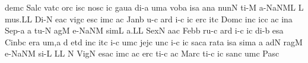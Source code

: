 \sgn dem\punctum c\egn
\spatium
\sgn Sal\punctum c\egn
\sgn vat\punctum c\egn
\sgn {}or\punctum c\egn
\sgn {}is\punctum c\egn
\spatium
\sgn nos\punctum c\egn
{}i{}\punctum c\egn
\spatium
\sgn gau\punctum a\egn
\sgn di-\punctum a\egn
\sgn {}um\punctum a\egn
\spatium
\sgn vob\punctum a\egn
\sgn {}is\punctum a\egn
\spatium
\sgn {}an\punctum a\egn
\sgn nun\punctum N\egn
\sgn ti-\punctum M\egn
\sgn {}a-\pessubbipunctis NaNM\nonspatium\punctuminclinatum L\egn
\custos L
\lineaproxima
\sgn mu{s.}\punctum L\augmentum L\egn
\spatium
\divisiofinalis
\spatium
\sgn Di-\punctum N\egn
\sgn {}e{}\pes ac\egn
\spatium
\sgn vig\punctum c\egn
\sgn {}es\punctum c\egn
\sgn {}im\punctum c\egn
\sgn {}a{}\punctum c\egn
\spatium
\sgn Jan\punctum b\egn
\sgn {}u-\punctum c\egn
\sgn {}ar\punctum d\egn
\sgn {}i-\punctum c\egn
\sgn {}i{}\punctum c\egn
\spatium
\sgn {}er\punctum c\egn
\sgn {}it\punctum c\egn
\spatium
\sgn Dom\punctum c\egn
\sgn {}in\punctum c\egn
\sgn {}ic\punctum c\egn
\sgn {}a{}\punctum c\egn
\spatium
\sgn {}in\punctum a\egn
\spatium
\sgn Se{p-}\punctum a\egn
\custos a
\lineaproxima
\sgn tu-\punctum N\egn
\sgn {}ag\punctum M\egn
\sgn {}e-\pessubbipunctis NaNM\egn
\sgn sim\punctum L\egn
\sgn {}a.\punctum L\augmentum L\egn
\spatium
\divisiofinalis
\spatium
\sgn Sex\punctum N\egn
{}a{}\pes ac\egn
\spatium
\sgn Feb\punctum b\egn
\sgn ru-\punctum c\egn
\sgn {}ar\punctum d\egn
\sgn {}i-\punctum c\egn
\sgn {}i{}\punctum c\egn
\spatium
\sgn di-\punctum b\egn
\sgn {}es\punctum a\egn
\spatium
\sgn Cin\pes bc\egn
\sgn {}er\punctum a\egn
\sgn {}u{m,}\punctum a\egn
\spatium
\divisiominima
\spatium
\custos d
\lineaproxima
\sgn { }et\punctum d\egn
\spatium
\sgn {}in\punctum c\egn
\sgn {}it\punctum c\egn
\sgn {}i-\punctum c\egn
\sgn {}um\punctum c\egn
\spatium
\sgn jej\punctum c\egn
\sgn {}un\punctum c\egn
\sgn {}i-\punctum c\egn
\sgn {}i{}\punctum c\egn
\spatium
\sgn sac\punctum a\egn
\sgn rat\punctum a\egn
\sgn {}is\punctum a\egn
\sgn sim\punctum a\egn
\sgn {}{\ae}{}\punctum a\egn
\spatium
{}ad\punctum N\egn
\sgn rag\punctum M\egn
\sgn {}e-\pessubbipunctis NaNM\egn
\sgn si-\punctum L\egn
{}\punctum L\augmentum L\egn
\spatium
\divisiofinalis
\spatium
\custos N
\lineaproxima
\sgn Vig\punctum N\egn
\sgn {}es\pes ac\egn
\sgn {}im\punctum c\egn
\sgn {}a{}\punctum c\egn
\spatium
{}er\punctum c\egn 
\sgn ti{-}\punctum c\egn
\sgn {}a{}\punctum c\egn
\spatium
\sgn Mar\punctum c\egn
\sgn ti-\punctum c\egn
\sgn {}i{}\punctum c\egn
\spatium
\sgn san\punctum c\egn
{}um\punctum c\egn
\spatium
\sgn Pas\punctum c\egn
